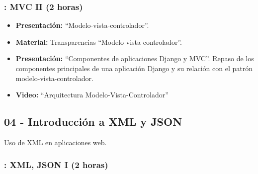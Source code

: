 \documentclass[a4paper,12pt]{article}
\begin{document}
\subsubsection{\juevesK: MVC II (2 horas)}
\label{cal:juevesK}

\begin{itemize}
\item \textbf{Presentación:} ``Modelo-vista-controlador''.
\item \textbf{Material:} Transparencias ``Modelo-vista-controlador''.
\item \textbf{Presentación:} ``Componentes de aplicaciones Django y MVC''.
  Repaso de los componentes principales de una aplicación Django y su relación con el patrón modelo-vista-controlador.
\item \textbf{Video:} ``Arquitectura Modelo-Vista-Controlador''
\end{itemize}


\subsection{04 - Introducción a XML y JSON}

Uso de XML en aplicaciones web.

\subsubsection{\juevesL: XML, JSON I (2 horas)}
\label{cal:juevesL}
\end{document}
